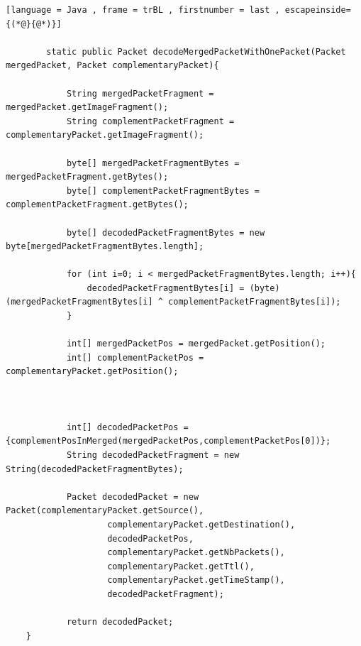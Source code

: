         \begin{lstlisting}[language = Java , frame = trBL , firstnumber = last , escapeinside={(*@}{@*)}]
        
        static public Packet decodeMergedPacketWithOnePacket(Packet mergedPacket, Packet complementaryPacket){

            String mergedPacketFragment = mergedPacket.getImageFragment();
            String complementPacketFragment = complementaryPacket.getImageFragment();
    
            byte[] mergedPacketFragmentBytes = mergedPacketFragment.getBytes();
            byte[] complementPacketFragmentBytes = complementPacketFragment.getBytes();
    
            byte[] decodedPacketFragmentBytes = new byte[mergedPacketFragmentBytes.length];
    
            for (int i=0; i < mergedPacketFragmentBytes.length; i++){
                decodedPacketFragmentBytes[i] = (byte) (mergedPacketFragmentBytes[i] ^ complementPacketFragmentBytes[i]);
            }
    
            int[] mergedPacketPos = mergedPacket.getPosition();
            int[] complementPacketPos = complementaryPacket.getPosition();
    
    
    
            int[] decodedPacketPos = {complementPosInMerged(mergedPacketPos,complementPacketPos[0])};
            String decodedPacketFragment = new String(decodedPacketFragmentBytes);
    
            Packet decodedPacket = new Packet(complementaryPacket.getSource(),
                    complementaryPacket.getDestination(),
                    decodedPacketPos,
                    complementaryPacket.getNbPackets(),
                    complementaryPacket.getTtl(),
                    complementaryPacket.getTimeStamp(),
                    decodedPacketFragment);
    
            return decodedPacket;
    }
        
        \end{lstlisting}
 